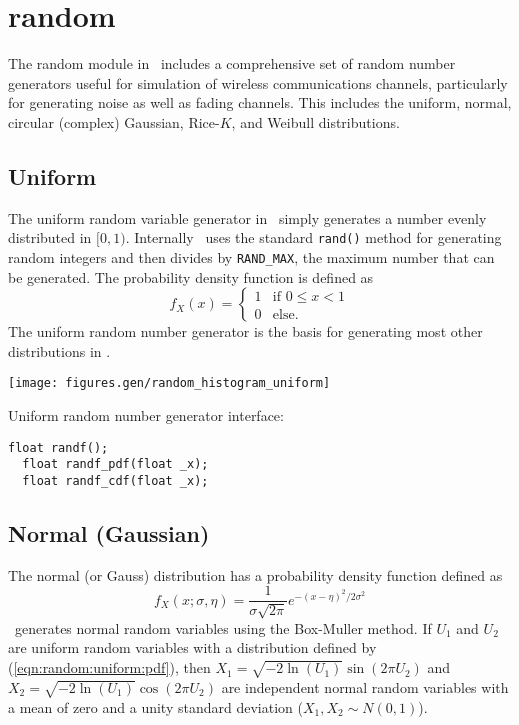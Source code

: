 % 
%

\newpage
\section{random}
\label{module:random}
The random module in \liquid\ includes a comprehensive set of
random number generators useful for simulation of wireless
communications channels,
particularly for generating noise as well as fading channels.
This includes the
uniform,
normal,
circular (complex) Gaussian,
Rice-$K$, and
Weibull distributions.


% 
%
\subsection{Uniform}
\label{module:random:uniform}
The uniform random variable generator in \liquid\ simply generates a
number evenly distributed in $[0,1)$.
Internally \liquid\ uses the standard {\tt rand()} method for generating
random integers and then divides by {\tt RAND\_MAX}, the maximum number
that can be generated.
The probability density function is defined as
%
\begin{equation}
\label{eqn:random:uniform:pdf}
    f_X(x) =
    \begin{cases}
        1 & \text{if $0 \leq x < 1$} \\
        0 & \text{else}.
    \end{cases}
\end{equation}
%
The uniform random number generator is the basis for generating most
other distributions in \liquid.

\begin{minipage}{0.5\textwidth}
  \texttt{[image: figures.gen/random\_histogram\_uniform]}
\end{minipage}
\begin{minipage}{0.5\textwidth}
  Uniform random number generator interface:
  \begin{Verbatim}[fontsize=\small]
  float randf();
  float randf_pdf(float _x);
  float randf_cdf(float _x);
  \end{Verbatim}
\end{minipage}


\subsection{Normal (Gaussian)}
\label{module:random:normal}
The normal (or Gauss) distribution has a probability density function
defined as
%
\begin{equation}
\label{eqn:random:normal:pdf}
    f_X(x;\sigma,\eta) =
        \frac{1}{\sigma \sqrt{2 \pi}}
        e^{-\left(x-\eta\right)^2/{2\sigma^2}}
\end{equation}
%
\liquid\ generates normal random variables using the Box-Muller method.
If $U_1$ and $U_2$ are uniform random variables with a distribution
defined by (\ref{eqn:random:uniform:pdf}), then
$X_1 = \sqrt{-2\ln(U_1)} \sin\left(2 \pi U_2\right)$ and
$X_2 = \sqrt{-2\ln(U_1)} \cos\left(2 \pi U_2\right)$
are independent normal random variables with a mean of zero and a unity
standard deviation ($X_1, X_2 \sim N(0,1)$).

